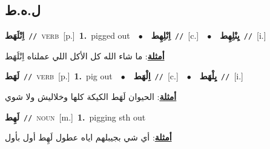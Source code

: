 \documentclass[10pt,a4paper,twoside]{article} %
\begin{document}
\begin{multicols}{2}
\vspace{-3mm}
\subsection*{\color{blue}\foreignlanguage{arabic}{ل.ه.ط}\color{blue}{}} 

{\setlength\topsep{0pt}\textbf{\foreignlanguage{arabic}{اِنْلَهَط}}\ {\color{gray}\texttt{//}\color{black}}\ \textsc{verb}\ [p.]\ \textbf{1.}~pigged out\ \ $\bullet$\ \ \setlength\topsep{0pt}\textbf{\foreignlanguage{arabic}{اِنْلِهِط}}\ {\color{gray}\texttt{//}\color{black}}\ [c.]\ \ $\bullet$\ \ \setlength\topsep{0pt}\textbf{\foreignlanguage{arabic}{يِنْلِهِط}}\ {\color{gray}\texttt{//}\color{black}}\ [i.]\  \begin{flushright}\color{gray}\foreignlanguage{arabic}{\textbf{\underline{\foreignlanguage{arabic}{أمثلة}}}: ما شاء الله كل الأكل اللي عملناه اِنْلَهَط}\end{flushright}\color{black}} \vspace{2mm}

{\setlength\topsep{0pt}\textbf{\foreignlanguage{arabic}{لَهَط}}\ {\color{gray}\texttt{//}\color{black}}\ \textsc{verb}\ [p.]\ \textbf{1.}~pig out\ \ $\bullet$\ \ \setlength\topsep{0pt}\textbf{\foreignlanguage{arabic}{اِلْهَط}}\ {\color{gray}\texttt{//}\color{black}}\ [c.]\ \ $\bullet$\ \ \setlength\topsep{0pt}\textbf{\foreignlanguage{arabic}{يِلْهَط}}\ {\color{gray}\texttt{//}\color{black}}\ [i.]\  \begin{flushright}\color{gray}\foreignlanguage{arabic}{\textbf{\underline{\foreignlanguage{arabic}{أمثلة}}}: الحيوان لَهَط الكيكة كلها وخلاليش ولا شوي}\end{flushright}\color{black}} \vspace{2mm}

{\setlength\topsep{0pt}\textbf{\foreignlanguage{arabic}{لَهِط}}\ {\color{gray}\texttt{//}\color{black}}\ \textsc{noun}\ [m.]\ \textbf{1.}~pigging sth out\  \begin{flushright}\color{gray}\foreignlanguage{arabic}{\textbf{\underline{\foreignlanguage{arabic}{أمثلة}}}: أي شي بجيبلهم اياه عطول لَهِط أول بأول}\end{flushright}\color{black}} \vspace{2mm}


\end{multicols}
\end{document}
